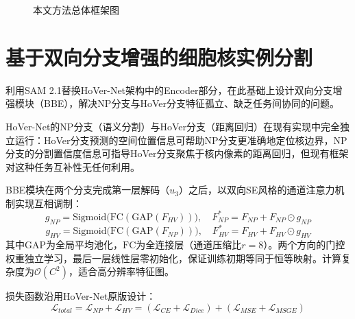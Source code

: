 \documentclass{sufethesismas}
\begin{document}
\begin{figure}[H]
{
  }
  \caption{本文方法总体框架图}
  \label{fig:arch}
\end{figure}

\section{基于双向分支增强的细胞核实例分割}

利用SAM 2.1替换HoVer-Net架构中的Encoder部分，在此基础上设计双向分支增强模块（BBE），解决NP分支与HoVer分支特征孤立、缺乏任务间协同的问题。

HoVer-Net的NP分支（语义分割）与HoVer分支（距离回归）在现有实现中完全独立运行：HoVer分支预测的空间位置信息可帮助NP分支更准确地定位核边界，NP分支的分割置信度信息可指导HoVer分支聚焦于核内像素的距离回归，但现有框架对这种任务互补性无任何利用。

BBE模块在两个分支完成第一层解码（$u_3$）之后，以双向SE风格的通道注意力机制实现互相调制：
\begin{equation}
  g_{NP} = \mathrm{Sigmoid}\bigl(\mathrm{FC}(\mathrm{GAP}(F_{HV}))\bigr), \quad
  F_{NP}^{*} = F_{NP} + F_{NP} \odot g_{NP}
\end{equation}
\begin{equation}
  g_{HV} = \mathrm{Sigmoid}\bigl(\mathrm{FC}(\mathrm{GAP}(F_{NP}))\bigr), \quad
  F_{HV}^{*} = F_{HV} + F_{HV} \odot g_{HV}
\end{equation}
其中$\mathrm{GAP}$为全局平均池化，$\mathrm{FC}$为全连接层（通道压缩比$r=8$）。两个方向的门控权重独立学习，最后一层线性层零初始化，保证训练初期等同于恒等映射。计算复杂度为$\mathcal{O}(C^2)$，适合高分辨率特征图。

损失函数沿用HoVer-Net原版设计：
\begin{equation}
  \mathcal{L}_{total} = \mathcal{L}_{NP} + \mathcal{L}_{HV}
  = (\mathcal{L}_{CE} + \mathcal{L}_{Dice}) + (\mathcal{L}_{MSE} + \mathcal{L}_{MSGE})
\end{equation}
\end{document}
